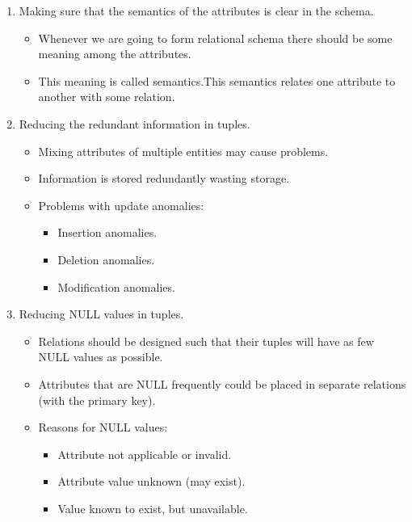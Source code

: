 \documentclass[10pt]{article}
\begin{document}
\begin{enumerate}
	\item Making sure that the semantics of the attributes is clear in the schema.
	
	\begin{itemize}
		\item Whenever we are going to form relational schema there should be some meaning among the attributes.
		\item This meaning is called semantics.This semantics relates one attribute to another with some relation.
	\end{itemize}

	\item Reducing the redundant information in tuples.
	
	\begin{itemize}
		\item Mixing attributes of multiple entities may cause problems.
		\item Information is stored redundantly wasting storage.
		\item Problems with update anomalies:
		
		\begin{itemize}
			\item Insertion anomalies.
			\item Deletion anomalies.
			\item Modification anomalies.
		\end{itemize}
	\end{itemize}

	\item Reducing NULL values in tuples.
	
	\begin{itemize}
		\item Relations should be designed such that their tuples will have as few NULL values as possible.
		\item Attributes that are NULL frequently could be placed in separate relations (with the primary key).
		\item Reasons for NULL values:
		
		\begin{itemize}
			\item Attribute not applicable or invalid.
			\item Attribute value unknown (may exist).
			\item Value known to exist, but unavailable.
		\end{itemize}
	\end{itemize}


\end{enumerate}
\end{document}
